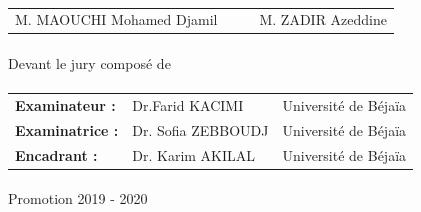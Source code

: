 \begin{titlepage}
\begin{center}
        \paragraph{}
        \begin{tabular}{l l l l}	
            M. MAOUCHI Mohamed Djamil & & & M. ZADIR Azeddine \\
        \end{tabular}
        \paragraph{}
        \large Devant le jury composé de
    \end{center}

    \paragraph{}

    \begin{table}[h!]
        \begin{center}
            \begin{tabular}{l l l}

                \textbf{Examinateur :} & Dr.Farid KACIMI &  Université de Béjaïa \\

                \textbf{Examinatrice :} & Dr. Sofia ZEBBOUDJ & Université de Béjaïa \\

                \textbf{Encadrant :} & Dr. Karim AKILAL & Université de Béjaïa \\

            \end{tabular}    
        \end{center}

    \end{table}

    \paragraph{}

    \begin{center} Promotion 2019 - 2020 \end{center}


\end{titlepage}
